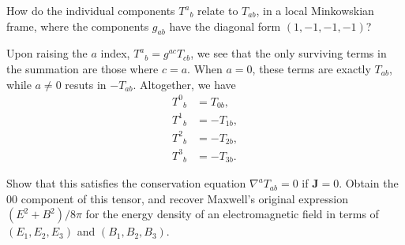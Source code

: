 \documentclass[../road-to-reality.tex]{subfiles}
\begin{document}
\begin{questions}
\question How do the individual components ${T^a}_b$ relate to $T_{ab}$, in a
  local Minkowskian frame, where the components $g_{ab}$ have the diagonal form
  $(1,-1,-1,-1)$?

  \begin{solution}
    Upon raising the $a$ index, ${T^a}_b = g^{ac}T_{cb}$, we see that the only
    surviving terms in the summation are those where $c = a$. When $a=0$, these
    terms are exactly $T_{ab}$, while $a\neq{0}$ resuts in $-T_{ab}$.
    Altogether, we have
    \begin{align*}
      {T^0}_b &= T_{0b}, \\
      {T^1}_b &= -T_{1b}, \\
      {T^2}_b &= -T_{2b}, \\
      {T^3}_b &= -T_{3b}.
    \end{align*}
  \end{solution}

\question Show that this satisfies the conservation equation $\nabla^aT_{ab}=0$
  if $\mathbf{J}=0$. Obtain the $00$ component of this tensor, and recover
  Maxwell's original expression $(E^2+B^2)/{8\pi}$ for the energy density of an
  electromagnetic field in terms of $(E_1,E_2,E_3)$ and $(B_1,B_2,B_3)$.


\end{questions}
\end{document}

